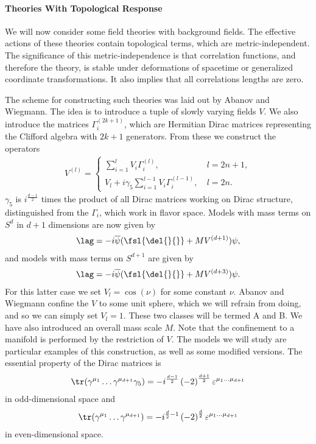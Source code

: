 \paragraph{Theories With Topological Response}
We will now consider some field theories with background fields. The effective actions of these theories contain topological terms, which are metric-independent. The significance of this metric-independence is that correlation functions, and therefore the theory, is stable under deformations of spacetime or generalized coordinate transformations. It also implies that all correlations lengths are zero.

The scheme for constructing such theories was laid out by Abanov and Wiegmann. The idea is to introduce a tuple of slowly varying fields $V$. We also introduce the matrices $\Gamma_{i}^{(2k + 1)}$, which are Hermitian Dirac matrices representing the Clifford algebra with $2k + 1$ generators. From these we construct the operators
\begin{align*}
	V^{(l)} = \begin{cases}
		\sum\limits_{i = 1}^{l}V_{i}\Gamma^{(l)}_{i},\ &l = 2n + 1, \\
		V_{l} + i\gamma_{5}\sum\limits_{i = 1}^{l - 1}V_{i}\Gamma^{(l - 1)}_{i},\ &l = 2n.
	\end{cases}
\end{align*}
$\gamma_{5}$ is $i^{\frac{d - 1}{2}}$ times the product of all Dirac matrices working on Dirac structure, distinguished from the $\Gamma_{i}$, which work in flavor space. Models with mass terms on $S^{d}$ in $d + 1$ dimensions are now given by
\begin{align*}
	\lag = -i\overline{\psi}(\fsl{\del{}{}} + MV^{(d + 1)})\psi,
\end{align*}
and models with mass terms on $S^{d + 1}$ are given by
\begin{align*}
	\lag = -i\overline{\psi}(\fsl{\del{}{}} + MV^{(d + 3)})\psi.
\end{align*}
For this latter case we set $V_{l} = \cos(\nu)$ for some constant $\nu$. Abanov and Wiegmann confine the $V$ to some unit sphere, which we will refrain from doing, and so we can simply set $V_{l} = 1$. These two classes will be termed A and B. We have also introduced an overall mass scale $M$. Note that the confinement to a manifold is performed by the restriction of $V$. The models we will study are particular examples of this construction, as well as some modified versions. The essential property of the Dirac matrices is
\begin{align*}
	\tr(\gamma^{\mu_{1}}\dots\gamma^{\mu_{d + 1}}\gamma_{5}) = -i^{\frac{d - 1}{2}}\left(-2\right)^{\frac{d + 1}{2}}\varepsilon^{\mu_{1}\dots\mu_{d + 1}}
\end{align*}
in odd-dimensional space and
\begin{align*}
	\tr(\gamma^{\mu_{1}}\dots\gamma^{\mu_{d + 1}}) =  -i^{\frac{d}{2} - 1}\left(-2\right)^{\frac{d}{2}}\varepsilon^{\mu_{1}\dots\mu_{d + 1}}
\end{align*}
in even-dimensional space.

